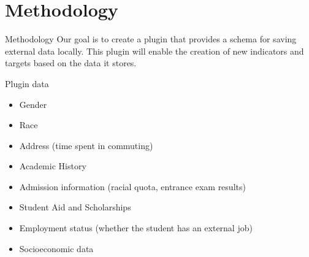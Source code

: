 \section{Methodology}

\begin{frame}{Methodology}
    Our goal is to create a plugin that provides a schema for saving external data locally. 
    This plugin will enable the creation of new indicators and targets based on the data it stores.
\end{frame}

\begin{frame}{Plugin data}
    \begin{itemize}[<+-|alert@+>]\color{gray}
        \item Gender
        \item Race
        \item Address (time spent in commuting)
        \item Academic History
        \item Admission information (racial quota, entrance exam results)
        \item Student Aid and Scholarships
        \item Employment status (whether the student has an external job)
        \item Socioeconomic data
    \end{itemize}
\end{frame}


